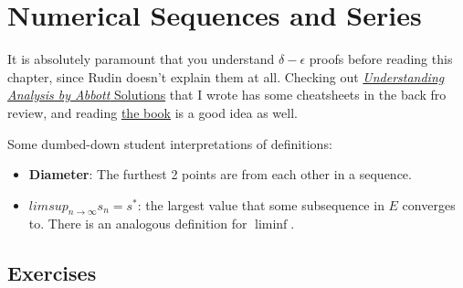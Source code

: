 \chapter{Numerical Sequences and Series}

It is absolutely paramount that you understand $\delta-\epsilon$ proofs before reading this chapter, since Rudin doesn't explain them at all.
Checking out \href{https://github.com/mikinty/Understanding-Analysis-Abbott-Solutions}{\textit{Understanding Analysis by Abbott} Solutions} that I wrote has some cheatsheets in the back fro review, and reading \href{https://amzn.to/3t3w4HN}{the book} is a good idea as well.

Some dumbed-down student interpretations of definitions:
\begin{itemize}
  \item \textbf{Diameter}: The furthest 2 points are from each other in a sequence.
  \item $limsup_{n\to \infty} s_n = s^*$: the largest value that some subsequence in $E$ converges to. There is an analogous definition for $\liminf$.
\end{itemize}

\section{Exercises}


